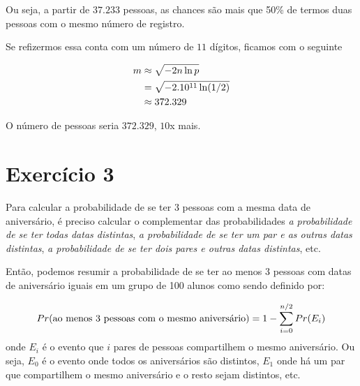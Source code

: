\documentclass{article}
\begin{document}
Ou seja, a partir de $37.233$ pessoas, as chances são mais que 50\% 
de termos duas pessoas com o mesmo número de registro.

Se refizermos essa conta com um número de $11$ dígitos, ficamos com o seguinte

\begin{equation}
\notag
	\begin{split}
		m &\approx \sqrt{-2n \ln p}\\
		&= \sqrt{-2.10^{11} \ln (1/2)}\\
		&\approx 372.329
	\end{split}
\end{equation}

O número de pessoas seria $372.329$, $10$x mais.

\section{Exercício 3}
Para calcular a probabilidade de se ter 3 pessoas com a mesma data de aniversário, é
preciso calcular o complementar das probabilidades \emph{a probabilidade de se ter todas
 datas distintas}, \emph{a probabilidade de se ter um par e as outras datas distintas}, 
 \emph{a probabilidade de se ter dois pares e outras datas distintas}, etc.

Então, podemos resumir a probabilidade de se ter ao menos 3 pessoas com datas de 
aniversário iguais em um grupo de 100 alunos como sendo definido por:

\begin{equation}
	\notag
	Pr(\text{ao menos 3 pessoas com o mesmo aniversário}) = 1 - \sum\limits_{i=0}^{n/2} Pr(E_{i})
\end{equation}
onde $E_i$ é o evento que $i$ pares de pessoas compartilhem o mesmo aniversário. Ou seja,
$E_0$ é o evento onde todos os aniversários são distintos, $E_1$ onde há um par que 
compartilhem o mesmo aniversário e o resto sejam distintos, etc.
\end{document}
